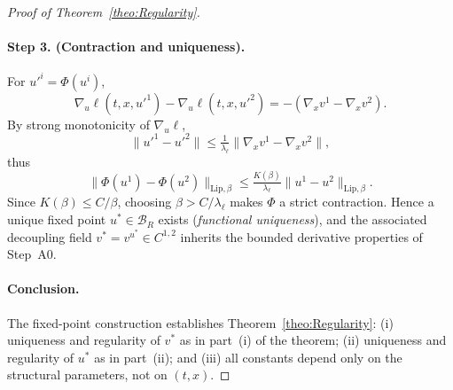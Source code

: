 \documentclass[10pt,a4paper]{amsart}
\begin{document}
\begin{proof}[Proof of Theorem~\ref{theo:Regularity}]
\paragraph{Step 3. (Contraction and uniqueness).}
For $u'^i=\Phi(u^i)$,
\[
\nabla_u\ell(t,x,u'^1)-\nabla_u\ell(t,x,u'^2)
=-(\nabla_x v^1-\nabla_x v^2).
\]
By strong monotonicity of $\nabla_u\ell$,
\[
\|u'^1-u'^2\|
\le\tfrac{1}{\lambda_\ell}\|\nabla_x v^1-\nabla_x v^2\|,
\]
thus
\[
\|\Phi(u^1)-\Phi(u^2)\|_{\mathrm{Lip},\beta}
\le\tfrac{K(\beta)}{\lambda_\ell}\|u^1-u^2\|_{\mathrm{Lip},\beta}.
\]
Since $K(\beta)\le C/\beta$, choosing $\beta>C/\lambda_\ell$ makes $\Phi$ a strict contraction.  
Hence a unique fixed point $u^*\in\mathcal{B}_R$ exists (\emph{functional uniqueness}),  
and the associated decoupling field $v^*=v^{u^*}\in C^{1,2}$ inherits the bounded derivative properties of Step~A0.

\paragraph{Conclusion.}
The fixed-point construction establishes Theorem~\ref{theo:Regularity}:  
(i) uniqueness and regularity of $v^*$ as in part~(i) of the theorem;  
(ii) uniqueness and regularity of $u^*$ as in part~(ii);  
and (iii) all constants depend only on the structural parameters, not on $(t,x)$.
\end{proof}
\end{document}
